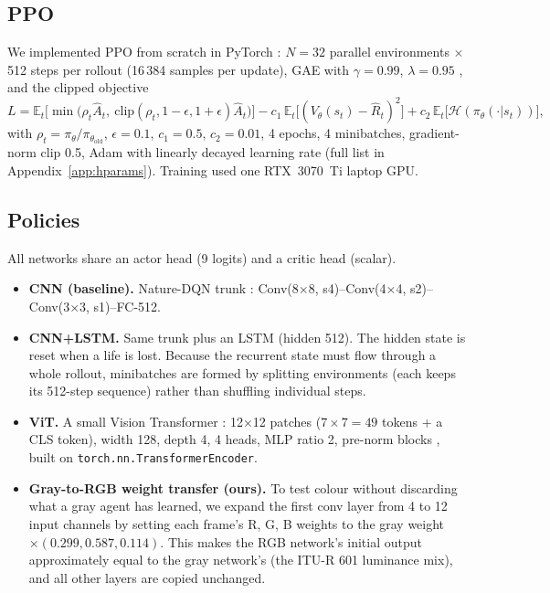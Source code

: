 \documentclass[11pt]{article}
\begin{document}
\subsection{PPO}
We implemented PPO from scratch in PyTorch \citep{schulman2017ppo}: $N{=}32$ parallel environments $\times$ 512 steps per rollout (16\,384 samples per update), GAE with $\gamma{=}0.99$, $\lambda{=}0.95$ \citep{schulman2016gae}, and the clipped objective
\begin{equation}
  L = \mathbb E_t\!\Big[\min\!\big(\rho_t \hat A_t,\ \mathrm{clip}(\rho_t,1{-}\epsilon,1{+}\epsilon)\hat A_t\big)\Big] - c_1 \,\mathbb E_t\big[(V_\theta(s_t)-\hat R_t)^2\big] + c_2\, \mathbb E_t\big[\mathcal H(\pi_\theta(\cdot|s_t))\big],
\end{equation}
with $\rho_t=\pi_\theta/\pi_{\theta_{\text{old}}}$, $\epsilon{=}0.1$, $c_1{=}0.5$, $c_2{=}0.01$, 4 epochs, 4 minibatches, gradient-norm clip 0.5, Adam \citep{kingma2015adam} with linearly decayed learning rate (full list in Appendix~\ref{app:hparams}). Training used one RTX~3070~Ti laptop GPU.

\subsection{Policies}
All networks share an actor head (9 logits) and a critic head (scalar).
\begin{itemize}\setlength{\itemsep}{0pt}
  \item \textbf{CNN (baseline).} Nature-DQN trunk \citep{mnih2015dqn}: Conv(8$\times$8, s4)--Conv(4$\times$4, s2)--Conv(3$\times$3, s1)--FC-512.
  \item \textbf{CNN+LSTM.} Same trunk plus an LSTM (hidden 512). The hidden state is reset when a life is lost. Because the recurrent state must flow through a whole rollout, minibatches are formed by splitting environments (each keeps its 512-step sequence) rather than shuffling individual steps.
  \item \textbf{ViT.} A small Vision Transformer \citep{dosovitskiy2021vit}: 12$\times$12 patches ($7{\times}7{=}49$ tokens + a CLS token), width 128, depth 4, 4 heads, MLP ratio 2, pre-norm blocks \citep{xiong2020layernorm}, built on \texttt{torch.nn.TransformerEncoder}.
  \item \textbf{Gray-to-RGB weight transfer (ours).} To test colour without discarding what a gray agent has learned, we expand the first conv layer from 4 to 12 input channels by setting each frame's R, G, B weights to the gray weight $\times(0.299, 0.587, 0.114)$. This makes the RGB network's initial output approximately equal to the gray network's (the ITU-R 601 luminance mix), and all other layers are copied unchanged.
\end{itemize}
\end{document}
